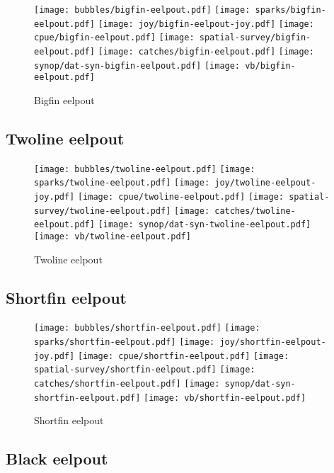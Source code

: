 \begin{figure}[htbp]
\centering
\texttt{[image: bubbles/bigfin-eelpout.pdf]}
\texttt{[image: sparks/bigfin-eelpout.pdf]}
\texttt{[image: joy/bigfin-eelpout-joy.pdf]}
\texttt{[image: cpue/bigfin-eelpout.pdf]}
\texttt{[image: spatial-survey/bigfin-eelpout.pdf]}
\texttt{[image: catches/bigfin-eelpout.pdf]}
\texttt{[image: synop/dat-syn-bigfin-eelpout.pdf]}
\texttt{[image: vb/bigfin-eelpout.pdf]}
\caption{Bigfin eelpout}
\end{figure}
\clearpage
\subsection*{Twoline eelpout}

\begin{figure}[htbp]
\centering
\texttt{[image: bubbles/twoline-eelpout.pdf]}
\texttt{[image: sparks/twoline-eelpout.pdf]}
\texttt{[image: joy/twoline-eelpout-joy.pdf]}
\texttt{[image: cpue/twoline-eelpout.pdf]}
\texttt{[image: spatial-survey/twoline-eelpout.pdf]}
\texttt{[image: catches/twoline-eelpout.pdf]}
\texttt{[image: synop/dat-syn-twoline-eelpout.pdf]}
\texttt{[image: vb/twoline-eelpout.pdf]}
\caption{Twoline eelpout}
\end{figure}
\clearpage
\subsection*{Shortfin eelpout}

\begin{figure}[htbp]
\centering
\texttt{[image: bubbles/shortfin-eelpout.pdf]}
\texttt{[image: sparks/shortfin-eelpout.pdf]}
\texttt{[image: joy/shortfin-eelpout-joy.pdf]}
\texttt{[image: cpue/shortfin-eelpout.pdf]}
\texttt{[image: spatial-survey/shortfin-eelpout.pdf]}
\texttt{[image: catches/shortfin-eelpout.pdf]}
\texttt{[image: synop/dat-syn-shortfin-eelpout.pdf]}
\texttt{[image: vb/shortfin-eelpout.pdf]}
\caption{Shortfin eelpout}
\end{figure}
\clearpage
\subsection*{Black eelpout}


